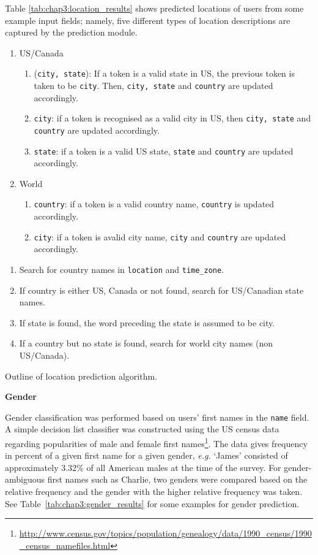 \documentclass[a4paper,12pt,twoside,openright]{report}
\newcommand{\tb}{\vspace{10pt} \textbf}
\newcommand{\ti}{\textit}
\newcommand{\tx}{\texttt}
\begin{document}
\noindent Table \ref{tab:chap3:location_results} shows predicted locations of users from some example input fields; namely, five different types of location descriptions are captured by the prediction module.
 
\begin{enumerate}[itemsep=-9pt]
	\item US/Canada
	\begin{enumerate}[itemsep=-9pt]
		\item (\tx{city, state}): If a token is a valid state in US, the previous token is taken to be \tx{city}. Then, \tx{city, state} and \tx{country} are updated accordingly.
		\item \tx{city}: if a token is recognised as a valid city in US, then \tx{city, state} and \tx{country} are updated accordingly.
		\item \tx{state}: if a token is a valid US state, \tx{state} and \tx{country} are updated accordingly.
	\end{enumerate}
	\item World
	\begin{enumerate}[itemsep=-9pt]
		\item \tx{country}: if a token is a valid country name, \tx{country} is updated accordingly.
		\item \tx{city}: if a token is avalid city name, \tx{city} and \tx{country} are updated accordingly. 
	\end{enumerate}
\end{enumerate}

\begin{algorithm}[htbp]
\begin{enumerate}
	\item Search for country names in \tx{location} and \tx{time\_zone}.
	\item If country is either US, Canada or not found, search for US/Canadian state names.
	\item If state is found, the word preceding the state is assumed to be city.
	\item If a country but no state is found, search for world city names (non US/Canada).
\end{enumerate}
\caption{Outline of location prediction algorithm.}
\label{alg:chap2:location_algorithm}
\end{algorithm}

\tb{Gender}

Gender classification was performed based on users' first names in the \tx{name} field. A simple decision list classifier was constructed using the US census data regarding popularities of male and female first names\footnote{\url{http://www.census.gov/topics/population/genealogy/data/1990_census/1990_census_namefiles.html}}. The data gives frequency in percent of a given first name for a given gender, \ti{e.g.} `James' consisted of approximately 3.32\% of all American males at the time of the survey. For gender-ambiguous first names such as Charlie, two genders were compared based on the relative frequency and the gender with the higher relative frequency was taken. See Table~\ref{tab:chap3:gender_results} for some examples for gender prediction.
\end{document}
